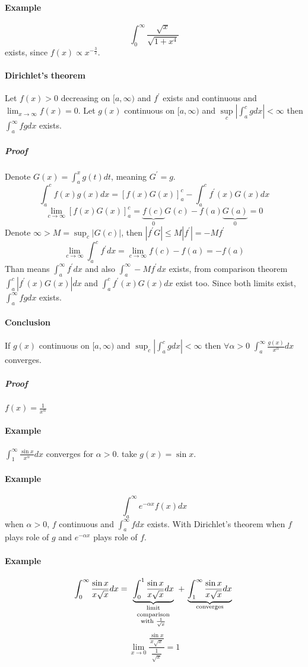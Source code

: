 \paragraph{Example}
$$\int_0^\infty \frac{\sqrt{x}}{\sqrt{1+x^4}}$$
exists, since $f(x) \propto x^{-\frac{3}{2}}$.
\paragraph{Dirichlet's theorem} Let $f(x) > 0$ decreasing on $[a,\infty)$ and $f^\prime$ exists and continuous and $\lim_{x\to\infty} f(x) = 0$. Let $g(x)$ continuous on $[a,\infty)$ and $\sup\limits_c \left| \int_a^c g dx \right| < \infty$ then $\int_a^\infty fg dx$ exists.
\subparagraph{Proof} Denote $G(x) = \int_a^x g(t) dt$, meaning $G^\prime = g$.
$$\int_a^c f(x)g(x) dx =\left[ f(x)G(x)\right]_a^c  - \int_a^c f^\prime(x) G(x) dx$$
$$\lim_{c\to\infty} \left[ f(x)G(x)\right]_a^c = \underbrace{f(c)}_{0}G(c) - f(a)\underbrace{G(a)}_{0} = 0$$
Denote $\infty > M = \sup_c |G(c)|$, then $\left|f^\prime G\right| \leq M\left| f^\prime \right| = -Mf^\prime$
$$\lim_{c\to\infty}\int_a^c f^\prime dx = \lim_{c\to\infty} f(c) - f(a) = -f(a)$$
Than means $\int_a^\infty f^\prime dx$ and also $\int_a^\infty -Mf^\prime dx$ exists, from comparison theorem $\int_a^c \left|f^\prime(x) G(x)\right| dx$  and $\int_a^c f^\prime(x) G(x) dx$ exist too. Since both limits exist, $\int_a^\infty fg dx$ exists.
\paragraph{Conclusion} If $g(x)$ continuous on $[a,\infty)$ and $\sup_c \left| \int_a^c g dx \right| < \infty$ then $\forall \alpha > 0$ $\int_a^\infty \frac{g(x)}{x^\alpha} dx$ converges. 
\subparagraph{Proof} $f(x)  =\frac{1}{x^\alpha}$
\paragraph{Example} $\int_1^\infty \frac{\sin x}{x^\alpha}dx$ converges for $\alpha > 0$. take $g(x) = \sin x$.
\paragraph{Example}
$$\int_a^\infty e^{-\alpha  x} f(x) dx$$ when $\alpha > 0$, $f$ continuous and $\int_a^\infty f dx$ exists.
With Dirichlet's theorem when $f$ plays role of $g$ and $e^{-\alpha  x}$ plays role of $f$.
\paragraph{Example}
$$\int_0^\infty \frac{\sin x}{x\sqrt{x}} dx = \underbrace{\int_0^1 \frac{\sin x}{x\sqrt{x}} dx}_{\parbox{2cm}{\scriptsize \centering limit comparison with $\frac{1}{\sqrt{x}}$}}+\underbrace{\int_1^\infty \frac{\sin x}{x\sqrt{x}} dx}_{\parbox{2cm}{\scriptsize \centering converges}}$$
$$\lim_{x\to 0} \frac{\frac{\sin x}{x\sqrt{x}}}{\frac{1}{\sqrt{x}}} = 1$$
